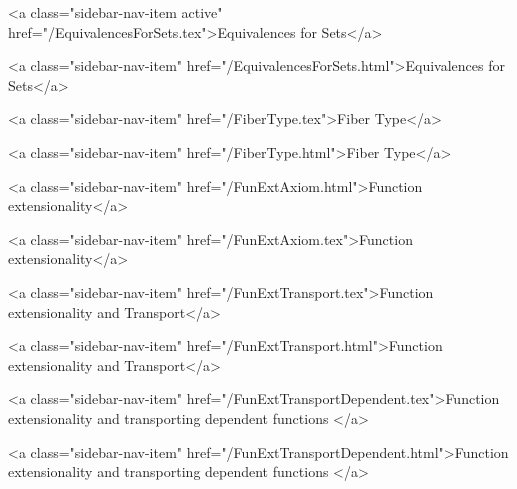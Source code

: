       
    
      
        
          <a class="sidebar-nav-item active" href="/EquivalencesForSets.tex">Equivalences for Sets</a>
        
      
    
      
        
          <a class="sidebar-nav-item" href="/EquivalencesForSets.html">Equivalences for Sets</a>
        
      
    
      
        
          <a class="sidebar-nav-item" href="/FiberType.tex">Fiber Type</a>
        
      
    
      
        
          <a class="sidebar-nav-item" href="/FiberType.html">Fiber Type</a>
        
      
    
      
        
          <a class="sidebar-nav-item" href="/FunExtAxiom.html">Function extensionality</a>
        
      
    
      
        
          <a class="sidebar-nav-item" href="/FunExtAxiom.tex">Function extensionality</a>
        
      
    
      
        
          <a class="sidebar-nav-item" href="/FunExtTransport.tex">Function extensionality and Transport</a>
        
      
    
      
        
          <a class="sidebar-nav-item" href="/FunExtTransport.html">Function extensionality and Transport</a>
        
      
    
      
        
          <a class="sidebar-nav-item" href="/FunExtTransportDependent.tex">Function extensionality and transporting dependent functions </a>
        
      
    
      
        
          <a class="sidebar-nav-item" href="/FunExtTransportDependent.html">Function extensionality and transporting dependent functions </a>
        
